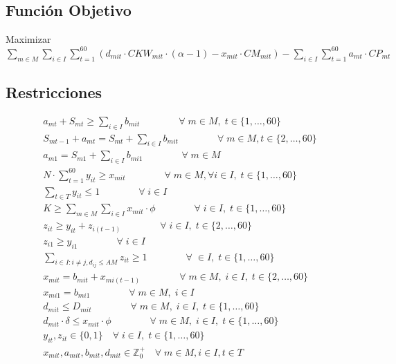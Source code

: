\documentclass[letterpaper]{article}
\begin{document}
\begin{flushleft}
		\subsection{Función Objetivo}
		\begin{center}
			Maximizar $\sum_{m \in M}\sum_{i \in I} \sum_{t=1}^{60} (d_{mit} \cdot CKW_{mit} \cdot (\alpha - 1) - x_{mit} \cdot CM_{mit}) - \sum_{i \in I} \sum_{t=1}^{60} a_{mt} \cdot CP_{mt}$
		\end{center}	
		
		\subsection{Restricciones}
		\begin{gather}
			a_{mt} + S_{mt} \geq \sum_{i \in I} b_{mit} \qquad\qquad \forall \; m \in M, \; t \in \{1, \ldots, 60\}\\
			S_{mt-1} + a_{mt} = S_{mt} + \sum_{i \in I} b_{mit} \qquad\qquad \forall \; m \in M, t \in \{2, \ldots, 60\}\\
			a_{m1} = S_{m1} + \sum_{i \in I} b_{mi1}  \qquad\qquad \forall \; m \in M\\
			N \cdot \sum_{t=1}^{60} y_{it} \geq x_{mit} \qquad\qquad \forall \; m \in M, \forall i \in I,\; t \in \{1, \ldots, 60\}\\
			\sum_{t \in T} y_{it} \leq 1 \qquad\qquad \forall \; i \in I\\
			K \geq \sum_{m \in M} \sum_{i \in I} x_{mit} \cdot \phi \qquad\qquad \forall \; i \in I, \; t \in \{1, \ldots, 60\}\\
			z_{it} \geq y_{it} + z_{i(t-1)} \qquad\qquad \forall \; i \in I, \;t \in \{2, \ldots, 60\}\\
			z_{i1} \geq y_{i1} \qquad\qquad \forall \; i \in I\\
			\sum_{i \in I: i \neq j, d_{ij}\leq AM} z_{it} \geq 1 \qquad\qquad \forall \; \in I, \; t \in \{1, \ldots, 60\}\\
			x_{mit} = b_{mit} + x_{mi(t-1)} \qquad\qquad \forall \; m \in M, \; i \in I, \; t \in \{2, \ldots, 60\}\\
			x_{mi1} = b_{mi1} \qquad\qquad \forall \; m \in M, \; i \in I\\
			d_{mit} \leq D_{mit} \qquad\qquad \forall \; m \in M, \; i \in I, \; t \in \{1, \ldots, 60\}\\
			d_{mit} \cdot \delta \leq x_{mit} \cdot \phi \qquad\qquad \forall \; m \in M, \; i \in I, \; t \in \{1, \ldots, 60\}\\
			y_{it}, z_{it} \in \{0, 1\} \quad \forall \; i \in I, \; t \in \{1, \ldots, 60\}\\
			x_{mit}, a_{mit}, b_{mit}, d_{mit} \in \mathbb{Z}^{+}_0 \quad \forall \; m\in M, i\in I, t\in T\\
		\end{gather}


\end{flushleft}
\end{document}
